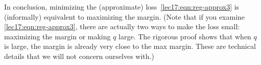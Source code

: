 In conclusion, minimizing the (approximate) loss~\eqref{lec17:eqn:reg-approx3} is (informally) equivalent to maximizing the margin. (Note that if you examine \eqref{lec17:eqn:reg-approx3}, there are actually two ways to make the loss small: maximizing the margin or making $q$ large. The rigorous proof shows that when $q$ is large, the margin is already very close to the max margin. These are technical details that we will not concern ourselves with.)
